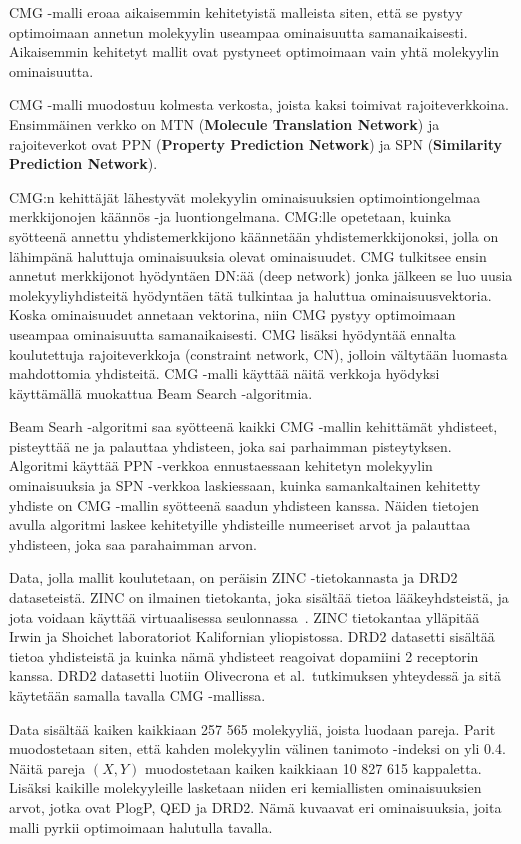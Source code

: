 \documentclass[finnish,twoside,censored,tkt,sw-line]{HYthesisML}
\begin{document}
CMG -malli eroaa aikaisemmin kehitetyistä malleista siten, että se pystyy optimoimaan annetun molekyylin useampaa ominaisuutta samanaikaisesti.
Aikaisemmin kehitetyt mallit ovat pystyneet optimoimaan vain yhtä molekyylin ominaisuutta.

CMG -malli muodostuu kolmesta verkosta, joista kaksi toimivat rajoiteverkkoina.
Ensimmäinen verkko on MTN (\textbf{Molecule Translation Network}) ja rajoiteverkot ovat PPN (\textbf{Property Prediction Network}) ja SPN (\textbf{Similarity Prediction Network}).

CMG:n kehittäjät lähestyvät molekyylin ominaisuuksien optimointiongelmaa merkkijonojen käännös -ja luontiongelmana.
CMG:lle opetetaan, kuinka syötteenä annettu yhdistemerkkijono käännetään yhdistemerkkijonoksi, jolla on lähimpänä haluttuja ominaisuuksia olevat ominaisuudet.
CMG tulkitsee ensin annetut merkkijonot hyödyntäen DN:ää (deep network) jonka jälkeen se luo uusia molekyyliyhdisteitä hyödyntäen tätä tulkintaa ja haluttua ominaisuusvektoria.
Koska ominaisuudet annetaan vektorina, niin CMG pystyy optimoimaan useampaa ominaisuutta samanaikaisesti.
CMG lisäksi hyödyntää ennalta koulutettuja rajoiteverkkoja (constraint network, CN), jolloin vältytään luomasta mahdottomia yhdisteitä.
CMG -malli käyttää näitä verkkoja hyödyksi käyttämällä muokattua Beam Search -algoritmia.

Beam Searh -algoritmi saa syötteenä kaikki CMG -mallin kehittämät yhdisteet, pisteyttää ne ja palauttaa yhdisteen, joka sai parhaimman pisteytyksen.
Algoritmi käyttää PPN -verkkoa ennustaessaan kehitetyn molekyylin ominaisuuksia ja SPN -verkkoa laskiessaan, kuinka samankaltainen kehitetty yhdiste on CMG -mallin syötteenä saadun yhdisteen kanssa.
Näiden tietojen avulla algoritmi laskee kehitetyille yhdisteille numeeriset arvot ja palauttaa yhdisteen, joka saa parahaimman arvon.

Data, jolla mallit koulutetaan, on peräisin ZINC -tietokannasta ja DRD2 dataseteistä.
ZINC on ilmainen tietokanta, joka sisältää tietoa lääkeyhdsteistä, ja jota voidaan käyttää virtuaalisessa seulonnassa~\cite{ZINC}.
ZINC tietokantaa ylläpitää Irwin ja Shoichet laboratoriot Kalifornian yliopistossa.
DRD2 datasetti sisältää tietoa yhdisteistä ja kuinka nämä yhdisteet reagoivat dopamiini 2 receptorin kanssa.
DRD2 datasetti luotiin Olivecrona et al.\ tutkimuksen yhteydessä ja sitä käytetään samalla tavalla CMG -mallissa.

Data sisältää kaiken kaikkiaan 257 565 molekyyliä, joista luodaan pareja.
Parit muodostetaan siten, että kahden molekyylin välinen tanimoto -indeksi on yli 0.4.
Näitä pareja \((X,Y)\) muodostetaan kaiken kaikkiaan 10 827 615 kappaletta.
Lisäksi kaikille molekyyleille lasketaan niiden eri kemiallisten ominaisuuksien arvot, jotka ovat PlogP, QED ja DRD2.
Nämä kuvaavat eri ominaisuuksia, joita malli pyrkii optimoimaan halutulla tavalla.
\end{document}
